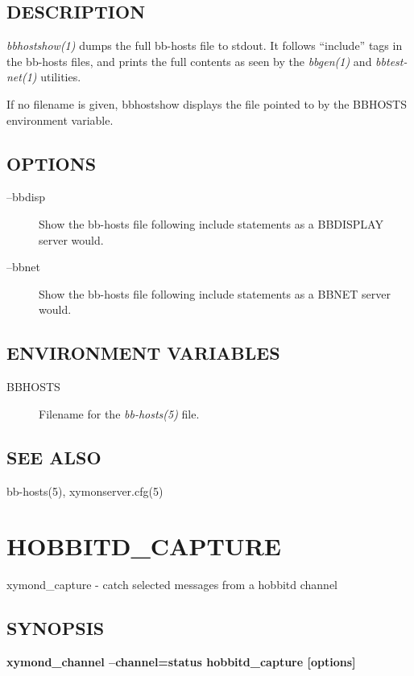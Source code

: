  
\subsection{DESCRIPTION}
\emph{bbhostshow(1)} dumps the full bb-hosts file to stdout. It
follows ``include'' tags in the bb-hosts files, and prints the full
contents as seen by the \emph{bbgen(1)} and \emph{bbtest-net(1)} utilities. 

  If no filename is given, bbhostshow displays the file pointed to by
  the BBHOSTS environment variable. 



 
\subsection{OPTIONS}
\begin{description}
\item[--bbdisp] Show the bb-hosts file following include statements as
  a BBDISPLAY server would. 


 

\item[--bbnet] Show the bb-hosts file following include statements as
  a BBNET server would. 

\end{description}
\subsection{ENVIRONMENT VARIABLES}
\begin{description}
\item[BBHOSTS] Filename for the \emph{bb-hosts(5)}
 file. 

 


\end{description}
\subsection{SEE ALSO}
bb-hosts(5), xymonserver.cfg(5) 

  
%
\newpage
\section{HOBBITD\_CAPTURE}

 xymond\_capture - catch selected messages from a hobbitd channel

\subsection{SYNOPSIS}
\textbf{xymond\_channel --channel=status hobbitd\_capture [options]}


